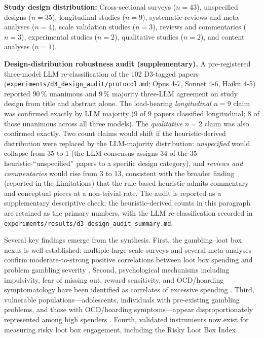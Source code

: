 \documentclass[12pt]{article}
\begin{document}
\textbf{Study design distribution:} Cross-sectional surveys ($n = 43$), unspecified designs ($n = 35$), longitudinal studies ($n = 9$), systematic reviews and meta-analyses ($n = 4$), scale validation studies ($n = 3$), reviews and commentaries ($n = 3$), experimental studies ($n = 2$), qualitative studies ($n = 2$), and content analyses ($n = 1$).

\textbf{Design-distribution robustness audit (supplementary).} A pre-registered three-model LLM re-classification of the 102 D3-tagged papers (\texttt{experiments/d3\_design\_audit/protocol.md}; Opus 4-7, Sonnet 4-6, Haiku 4-5) reported 90\,\% unanimous and 9\,\% majority three-LLM agreement on study design from title and abstract alone. The load-bearing \emph{longitudinal $n = 9$} claim was confirmed exactly by LLM majority (9 of 9 papers classified longitudinal; 8 of those unanimous across all three models). The \emph{qualitative $n = 2$} claim was also confirmed exactly. Two count claims would shift if the heuristic-derived distribution were replaced by the LLM-majority distribution: \emph{unspecified} would collapse from 35 to 1 (the LLM consensus assigns 34 of the 35 heuristic-``unspecified'' papers to a specific design category), and \emph{reviews and commentaries} would rise from 3 to 13, consistent with the broader finding (reported in the Limitations) that the rule-based heuristic admits commentary and conceptual pieces at a non-trivial rate. The audit is reported as a supplementary descriptive check; the heuristic-derived counts in this paragraph are retained as the primary numbers, with the LLM re-classification recorded in \texttt{experiments/results/d3\_design\_audit\_summary.md}.

Several key findings emerge from the synthesis. First, the gambling--loot box nexus is well established: multiple large-scale surveys and several meta-analyses confirm moderate-to-strong positive correlations between loot box spending and problem gambling severity \citep{Li2019, Zendle2019, Zendle2020, Spicer2022}. Second, psychological mechanisms including impulsivity, fear of missing out, reward sensitivity, and OCD/hoarding symptomatology have been identified as correlates of excessive spending \citep{Garea2023, Biegun2023}. Third, vulnerable populations---adolescents, individuals with pre-existing gambling problems, and those with OCD/hoarding symptoms---appear disproportionately represented among high spenders \citep{Close2023, Charnock2024}. Fourth, validated instruments now exist for measuring risky loot box engagement, including the Risky Loot Box Index \citep{Guo2025, Forsstrom2022}.
\end{document}
